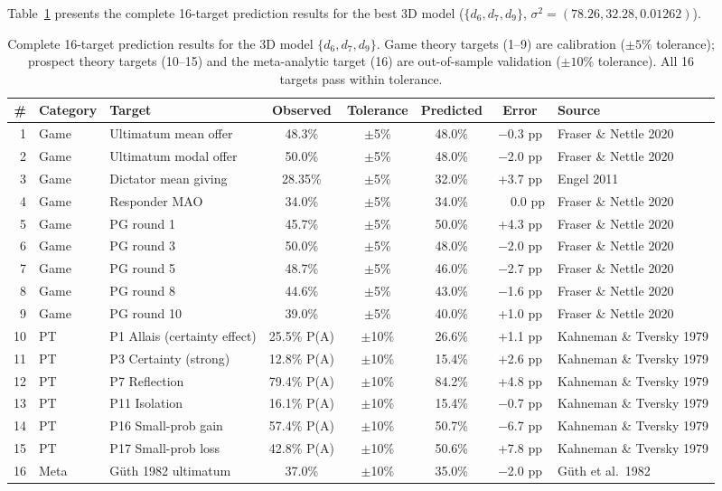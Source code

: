 \documentclass[manuscript,review,anonymous]{acmart}
\begin{document}
Table~\ref{tab:predictions} presents the complete 16-target prediction results for the best 3D model ($\{d_6, d_7, d_9\}$, $\sigma^2 = (78.26, 32.28, 0.01262)$).

\begin{table}[t]
\centering
\caption{Complete 16-target prediction results for the 3D model $\{d_6, d_7, d_9\}$. Game theory targets (1--9) are calibration ($\pm 5\%$ tolerance); prospect theory targets (10--15) and the meta-analytic target (16) are out-of-sample validation ($\pm 10\%$ tolerance). All 16 targets pass within tolerance.}
\label{tab:predictions}
\small
\begin{tabular}{@{}rllccccl@{}}
\toprule
\textbf{\#} & \textbf{Category} & \textbf{Target} & \textbf{Observed} & \textbf{Tolerance} & \textbf{Predicted} & \textbf{Error} & \textbf{Source} \\
\midrule
1 & Game & Ultimatum mean offer & 48.3\% & $\pm$5\% & 48.0\% & $-$0.3 pp & Fraser \& Nettle 2020 \\
2 & Game & Ultimatum modal offer & 50.0\% & $\pm$5\% & 48.0\% & $-$2.0 pp & Fraser \& Nettle 2020 \\
3 & Game & Dictator mean giving & 28.35\% & $\pm$5\% & 32.0\% & +3.7 pp & Engel 2011 \\
4 & Game & Responder MAO & 34.0\% & $\pm$5\% & 34.0\% & $\phantom{+}$0.0 pp & Fraser \& Nettle 2020 \\
5 & Game & PG round 1 & 45.7\% & $\pm$5\% & 50.0\% & +4.3 pp & Fraser \& Nettle 2020 \\
6 & Game & PG round 3 & 50.0\% & $\pm$5\% & 48.0\% & $-$2.0 pp & Fraser \& Nettle 2020 \\
7 & Game & PG round 5 & 48.7\% & $\pm$5\% & 46.0\% & $-$2.7 pp & Fraser \& Nettle 2020 \\
8 & Game & PG round 8 & 44.6\% & $\pm$5\% & 43.0\% & $-$1.6 pp & Fraser \& Nettle 2020 \\
9 & Game & PG round 10 & 39.0\% & $\pm$5\% & 40.0\% & +1.0 pp & Fraser \& Nettle 2020 \\
\midrule
10 & PT & P1 Allais (certainty effect) & 25.5\% P(A) & $\pm$10\% & 26.6\% & +1.1 pp & Kahneman \& Tversky 1979 \\
11 & PT & P3 Certainty (strong) & 12.8\% P(A) & $\pm$10\% & 15.4\% & +2.6 pp & Kahneman \& Tversky 1979 \\
12 & PT & P7 Reflection & 79.4\% P(A) & $\pm$10\% & 84.2\% & +4.8 pp & Kahneman \& Tversky 1979 \\
13 & PT & P11 Isolation & 16.1\% P(A) & $\pm$10\% & 15.4\% & $-$0.7 pp & Kahneman \& Tversky 1979 \\
14 & PT & P16 Small-prob gain & 57.4\% P(A) & $\pm$10\% & 50.7\% & $-$6.7 pp & Kahneman \& Tversky 1979 \\
15 & PT & P17 Small-prob loss & 42.8\% P(A) & $\pm$10\% & 50.6\% & +7.8 pp & Kahneman \& Tversky 1979 \\
\midrule
16 & Meta & G\"{u}th 1982 ultimatum & 37.0\% & $\pm$10\% & 35.0\% & $-$2.0 pp & G\"{u}th et al.\ 1982 \\
\bottomrule
\end{tabular}
\end{table}
\end{document}
